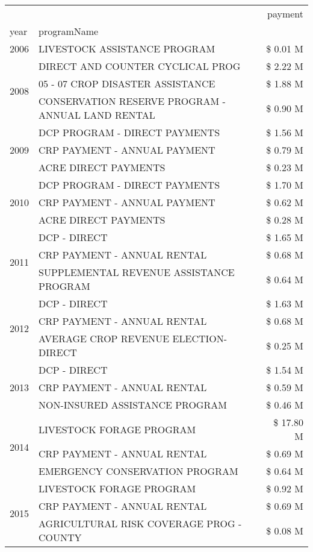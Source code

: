 \begin{tabular}{llr}
\toprule
 &  & payment \\
year & programName &  \\
\midrule
2006 & LIVESTOCK ASSISTANCE PROGRAM & \$ 0.01 M \\
\cline{1-3}
\multirow[t]{3}{*}{2008} & DIRECT AND COUNTER CYCLICAL PROG & \$ 2.22 M \\
 & 05 - 07 CROP DISASTER ASSISTANCE & \$ 1.88 M \\
 & CONSERVATION RESERVE PROGRAM - ANNUAL LAND RENTAL & \$ 0.90 M \\
\cline{1-3}
\multirow[t]{3}{*}{2009} & DCP PROGRAM - DIRECT PAYMENTS & \$ 1.56 M \\
 & CRP PAYMENT - ANNUAL PAYMENT & \$ 0.79 M \\
 & ACRE DIRECT PAYMENTS & \$ 0.23 M \\
\cline{1-3}
\multirow[t]{3}{*}{2010} & DCP PROGRAM - DIRECT PAYMENTS & \$ 1.70 M \\
 & CRP PAYMENT - ANNUAL PAYMENT & \$ 0.62 M \\
 & ACRE DIRECT PAYMENTS & \$ 0.28 M \\
\cline{1-3}
\multirow[t]{3}{*}{2011} & DCP - DIRECT & \$ 1.65 M \\
 & CRP PAYMENT - ANNUAL RENTAL & \$ 0.68 M \\
 & SUPPLEMENTAL REVENUE ASSISTANCE PROGRAM & \$ 0.64 M \\
\cline{1-3}
\multirow[t]{3}{*}{2012} & DCP - DIRECT & \$ 1.63 M \\
 & CRP PAYMENT - ANNUAL RENTAL & \$ 0.68 M \\
 & AVERAGE CROP REVENUE ELECTION-DIRECT & \$ 0.25 M \\
\cline{1-3}
\multirow[t]{3}{*}{2013} & DCP - DIRECT & \$ 1.54 M \\
 & CRP PAYMENT - ANNUAL RENTAL & \$ 0.59 M \\
 & NON-INSURED ASSISTANCE PROGRAM & \$ 0.46 M \\
\cline{1-3}
\multirow[t]{3}{*}{2014} & LIVESTOCK FORAGE PROGRAM & \$ 17.80 M \\
 & CRP PAYMENT - ANNUAL RENTAL & \$ 0.69 M \\
 & EMERGENCY CONSERVATION PROGRAM & \$ 0.64 M \\
\cline{1-3}
\multirow[t]{3}{*}{2015} & LIVESTOCK FORAGE PROGRAM & \$ 0.92 M \\
 & CRP PAYMENT - ANNUAL RENTAL & \$ 0.69 M \\
 & AGRICULTURAL RISK COVERAGE PROG - COUNTY & \$ 0.08 M \\

\end{tabular}

